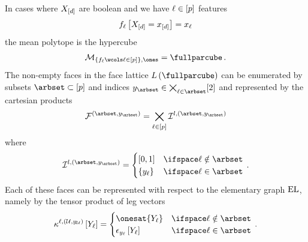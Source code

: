 \begin{example}[Hypercube]
    \label{exa:hypercubeFaces}
    In cases where $X_{[d]}$ are boolean and we have $\ell\in[p]$ features
    \begin{align*}
        f_{\ell}\left[X_{[d]}=x_{[d]}\right] = x_{\ell}
    \end{align*}
    the mean polytope is the hypercube
    \begin{align*}
        \meansetof{\{\formulaof{\selindex}\wcols\selindexin\},\trivbm} = \fullparcube \, .
    \end{align*}
    The non-empty faces in the face lattice $\facelatticeof{\fullparcube}$ can be enumerated by subsets $\arbset\subset[\seldim]$ and indices $\headindexof{\arbset}\in\bigtimes_{\selindex\in\arbset}[2]$ and represented by the cartesian products
    \begin{align*}
        \facesymbolof{(\arbset,\headindexof{\arbset})}
        = \bigtimes_{\selindexin} \mathcal{I}^{l,(\arbset,\headindexof{\arbset})}
    \end{align*}
    where
    \begin{align*}
        \mathcal{I}^{l,(\arbset,\headindexof{\arbset})}
        = \begin{cases}
        [0,1]
              & \ifspace \selindex\notin\arbset \\
              \{\headindexof{\selindex}\}& \ifspace \selindex\in\arbset
        \end{cases} \, .
    \end{align*}
    Each of these faces can be represented with respect to the elementary graph $\mathrm{EL}$, namely by the tensor product of leg vectors
    \begin{align*}
        \hardactlegwith
        = \begin{cases}
              \onesat{\headvariableof{\selindex}} & \ifspace \selindex\notin\arbset \\
              \onehotmapofat{\headindexof{\selindex}}{\headvariableof{\selindex}}& \ifspace \selindex\in\arbset
        \end{cases} \, .
    \end{align*}
\end{example}